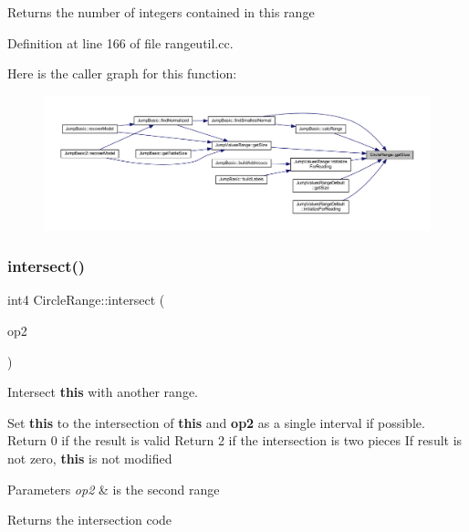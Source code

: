 \begin{DoxyReturn}{Returns}
the number of integers contained in this range 
\end{DoxyReturn}


Definition at line 166 of file rangeutil.\+cc.

Here is the caller graph for this function\+:
\nopagebreak
\begin{figure}[H]
\begin{center}
\leavevmode
\includegraphics[width=350pt]{class_circle_range_a606c680231a59b4439f17409d8c479e5_icgraph}
\end{center}
\end{figure}
\mbox{\label{class_circle_range_a9d8c4b0c9c8e9d51baa6eb2cbb551c6d}} 
\subsubsection{\texorpdfstring{intersect()}{intersect()}}
{\footnotesize\ttfamily int4 Circle\+Range\+::intersect (\begin{DoxyParamCaption}\item[{const \mbox{\hyperlink{class_circle_range}{Circle\+Range}} \&}]{op2 }\end{DoxyParamCaption})}



Intersect {\bfseries{this}} with another range. 

Set {\bfseries{this}} to the intersection of {\bfseries{this}} and {\bfseries{op2}} as a single interval if possible. Return 0 if the result is valid Return 2 if the intersection is two pieces If result is not zero, {\bfseries{this}} is not modified 
\begin{DoxyParams}{Parameters}
{\em op2} & is the second range \\
\hline
\end{DoxyParams}
\begin{DoxyReturn}{Returns}
the intersection code 
\end{DoxyReturn}


